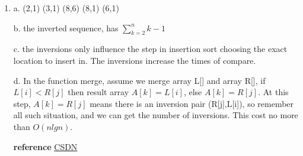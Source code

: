 \documentclass{article}
\begin{document}
\begin{enumerate}[\textbf{2-}1]
\item
\par a. (2,1) (3,1) (8,6) (8,1) (6,1)
\par b. the inverted sequence, has $\displaystyle{\sum_{k=2}^{n}k-1}$
\par c. the inversions only influence the step in insertion sort choosing the exact location to insert in. The inversions increase the times of compare.
\par d. In the function merge, assume we merge array L[] and array R[], if $L[i]<R[j]$ then result array $A[k]=L[i]$, else $A[k]=R[j]$. At this step, $A[k]=R[j]$ means there is an inversion pair (R[j],L[i]), so remember all such situation, and we can get the number of inversions. This cost no more than $O(nlgn)$.

\textbf{reference} \href{http://blog.csdn.net/zy825316/article/details/44001311}{CSDN}









 







\end{enumerate}
\end{document}
